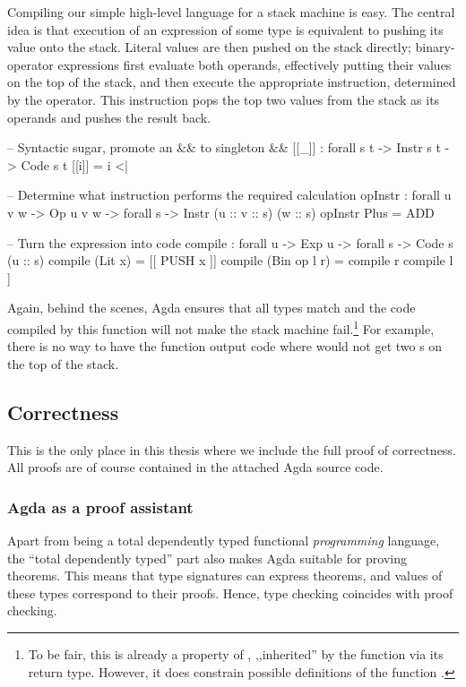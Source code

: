 Compiling our simple high-level language for a stack machine is easy. The
central idea is that execution of an expression of some type is equivalent to
pushing its value onto the stack. Literal values are then pushed on the stack
directly; binary-operator expressions first evaluate both operands, effectively
putting their values on the top of the stack, and then execute the appropriate
instruction, determined by the operator. This instruction pops the top
two values from the stack as its operands and pushes the result back.

\label{sec:simple-compiler}\begin{code}
  -- Syntactic sugar, promote an && to singleton &&
  [[_\;]] : forall {s t} -> Instr s t -> Code s t
  [[i\;]] = i <| \nil

  -- Determine what instruction performs the required calculation
  opInstr : forall {u v w} -> Op u v w -> forall {s} -> Instr (u :: v :: s) (w :: s)
  opInstr Plus = ADD

  -- Turn the expression into code
  compile : forall {u} -> Exp u -> forall {s} -> Code s (u :: s)
  compile (Lit x) = [[ PUSH x ]]
  compile (Bin op l r) = compile r \app compile l \app [[ opInstr op ]]
\end{code}

\noindent Again, behind the scenes, Agda ensures that all types match and the
code compiled by this function will not make the stack machine fail.\footnote{
  To be fair, this is already a property of , ,,inherited'' by the
  function  via its return type.  However, it does constrain
possible definitions of the function .} For example, there is no
way to have the function  output code where  would
not get two s on the top of the stack.

\subsection{Correctness}

This is the only place in this thesis where we include the full proof
of correctness. All proofs are of course contained in the attached Agda source
code.

\subsubsection{Agda as a proof assistant}

Apart from being a total dependently typed functional \emph{programming} language,
the ``total dependently typed'' part also makes Agda suitable for proving theorems.
This means that type signatures can express theorems, and values of these
types correspond to their proofs. Hence, type checking coincides with proof checking.

